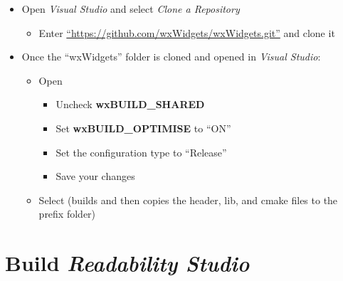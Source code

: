 \documentclass[
  letterpaper,
]{LegrandOrangeBook}
\providecommand{\tightlist}{%
  \setlength{\itemsep}{0pt}\setlength{\parskip}{0pt}}
\begin{document}
\begin{itemize}
\tightlist
\item
  Open \emph{Visual Studio} and select \emph{Clone a Repository}

  \begin{itemize}
  \tightlist
  \item
    Enter
    \href{https://github.com/wxWidgets/wxWidgets.git}{``https://github.com/wxWidgets/wxWidgets.git''}
    and clone it
  \end{itemize}
\item
  Once the ``wxWidgets'' folder is cloned and opened in \emph{Visual
  Studio}:

  \begin{itemize}
  \tightlist
  \item
    Open 

    \begin{itemize}
    \tightlist
    \item
      Uncheck \textbf{wxBUILD\_SHARED}
    \item
      Set \textbf{wxBUILD\_OPTIMISE} to ``ON''
    \item
      Set the configuration type to ``Release''
    \item
      Save your changes
    \end{itemize}
  \item
    Select  (builds and then copies
    the header, lib, and cmake files to the prefix folder)
  \end{itemize}
\end{itemize}

\newpage{}

\section*{\texorpdfstring{Build \emph{Readability
Studio}}{Build Readability Studio}}\label{build}

\end{document}
